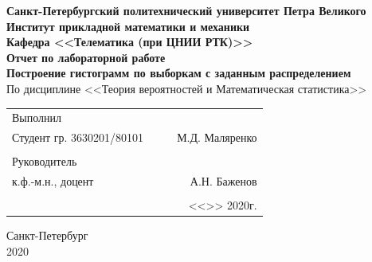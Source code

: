\documentclass[12pt]{article}
\begin{document}
\begin{titlepage}
	\begin{center}
		\hfill \break
		{\textbf{Санкт-Петербургский политехнический университет Петра Великого}}\\
		\hfill \break
		\textbf{Институт прикладной математики и механики}\\
		 \hfill \break
		\textbf{Кафедра <<Телематика (при ЦНИИ РТК)>>}\\
		\vfill
		\large{\bfseries Отчет по лабораторной работе}\\
		\hfill \break
		\hfill \break
		\hfill \break
		\hfill \break
		\normalsize{\bfseries Построение гистограмм по выборкам с заданным распределением}\\
		По дисциплине <<Теория вероятностей и Математическая статистика>>\\
		\hfill \break
		\hfill \break
		\hfill \break
	\end{center}
 
	\normalsize
	{ 
		\begin{tabular}{lp{2cm}cr}
			Выполнил &&&\\
			Студент гр. 3630201/80101&&\underline{\hspace{1.5cm}}& М.Д. Маляренко\\\\
			Руководитель&&&\\ 
			к.ф.-м.н., доцент && \underline{\hspace{1.5cm}}& А.Н. Баженов \\\\
			&&&<<\underline{\phantom{333}}>>\underline{\phantom{сентября000}}
			2020г.
		\end{tabular}
	}
\vfill

\begin{center} Санкт-Петербург \\2020 \end{center}
\end{titlepage}

\newpage

\setcounter{page}{2}
\end{document}
